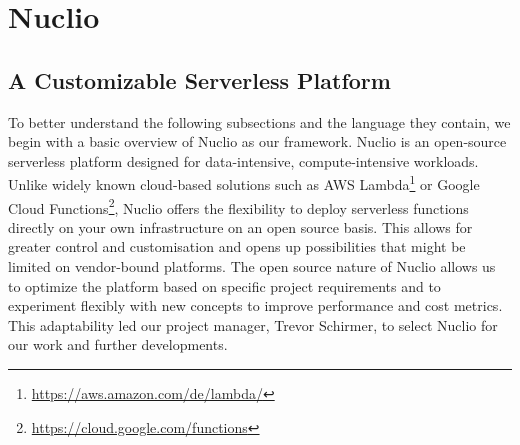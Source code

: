 \section{Nuclio}
\label{sec:nuclio}

\subsection{A Customizable Serverless Platform}
\label{sec:nuclio-introduction}
To better understand the following subsections and the language they contain, we begin with a basic overview of Nuclio as our framework. Nuclio is an open-source serverless platform designed for data-intensive, compute-intensive workloads. Unlike widely known cloud-based solutions such as AWS Lambda\footnote{\url{https://aws.amazon.com/de/lambda/}} or Google Cloud Functions\footnote{\url{https://cloud.google.com/functions}}, Nuclio offers the flexibility to deploy serverless functions directly on your own infrastructure on an open source basis. This allows for greater control and customisation and opens up possibilities that might be limited on vendor-bound platforms.
The open source nature of Nuclio allows us to optimize the platform based on specific project requirements and to experiment flexibly with new concepts to improve performance and cost metrics. This adaptability led our project manager, Trevor Schirmer, to select Nuclio for our work and further developments.

